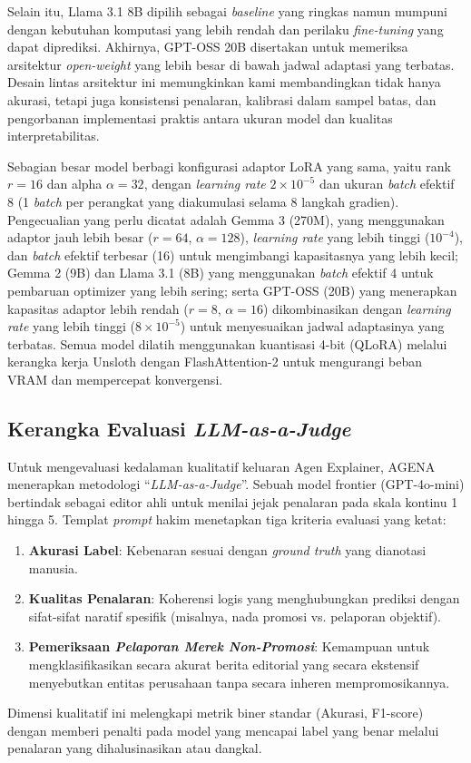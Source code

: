 \documentclass{ieeeaccess}
\begin{document}
Selain itu, Llama 3.1 8B dipilih sebagai \textit{baseline} yang ringkas namun mumpuni dengan kebutuhan komputasi yang lebih rendah dan perilaku \textit{fine-tuning} yang dapat diprediksi. Akhirnya, GPT-OSS 20B disertakan untuk memeriksa arsitektur \textit{open-weight} yang lebih besar di bawah jadwal adaptasi yang terbatas. Desain lintas arsitektur ini memungkinkan kami membandingkan tidak hanya akurasi, tetapi juga konsistensi penalaran, kalibrasi dalam sampel batas, dan pengorbanan implementasi praktis antara ukuran model dan kualitas interpretabilitas.

Sebagian besar model berbagi konfigurasi adaptor LoRA yang sama, yaitu rank $r=16$ dan alpha $\alpha=32$, dengan \textit{learning rate} $2\times10^{-5}$ dan ukuran \textit{batch} efektif 8 (1 \textit{batch} per perangkat yang diakumulasi selama 8 langkah gradien). Pengecualian yang perlu dicatat adalah Gemma 3 (270M), yang menggunakan adaptor jauh lebih besar ($r=64$, $\alpha=128$), \textit{learning rate} yang lebih tinggi ($10^{-4}$), dan \textit{batch} efektif terbesar (16) untuk mengimbangi kapasitasnya yang lebih kecil; Gemma 2 (9B) dan Llama 3.1 (8B) yang menggunakan \textit{batch} efektif 4 untuk pembaruan optimizer yang lebih sering; serta GPT-OSS (20B) yang menerapkan kapasitas adaptor lebih rendah ($r=8$, $\alpha=16$) dikombinasikan dengan \textit{learning rate} yang lebih tinggi ($8\times10^{-5}$) untuk menyesuaikan jadwal adaptasinya yang terbatas. Semua model dilatih menggunakan kuantisasi 4-bit (QLoRA) melalui kerangka kerja Unsloth dengan FlashAttention-2 untuk mengurangi beban VRAM dan mempercepat konvergensi.

\subsection{Kerangka Evaluasi \textit{LLM-as-a-Judge}}
Untuk mengevaluasi kedalaman kualitatif keluaran Agen Explainer, AGENA menerapkan metodologi ``\textit{LLM-as-a-Judge}''. Sebuah model frontier (GPT-4o-mini) bertindak sebagai editor ahli untuk menilai jejak penalaran pada skala kontinu 1 hingga 5. Templat \textit{prompt} hakim menetapkan tiga kriteria evaluasi yang ketat:
\begin{enumerate}
    \item \textbf{Akurasi Label}: Kebenaran sesuai dengan \textit{ground truth} yang dianotasi manusia.
    \item \textbf{Kualitas Penalaran}: Koherensi logis yang menghubungkan prediksi dengan sifat-sifat naratif spesifik (misalnya, nada promosi vs. pelaporan objektif).
    \item \textbf{Pemeriksaan \textit{Pelaporan Merek Non-Promosi}}: Kemampuan untuk mengklasifikasikan secara akurat berita editorial yang secara ekstensif menyebutkan entitas perusahaan tanpa secara inheren mempromosikannya.
\end{enumerate}
Dimensi kualitatif ini melengkapi metrik biner standar (Akurasi, F1-score) dengan memberi penalti pada model yang mencapai label yang benar melalui penalaran yang dihalusinasikan atau dangkal.
\end{document}
